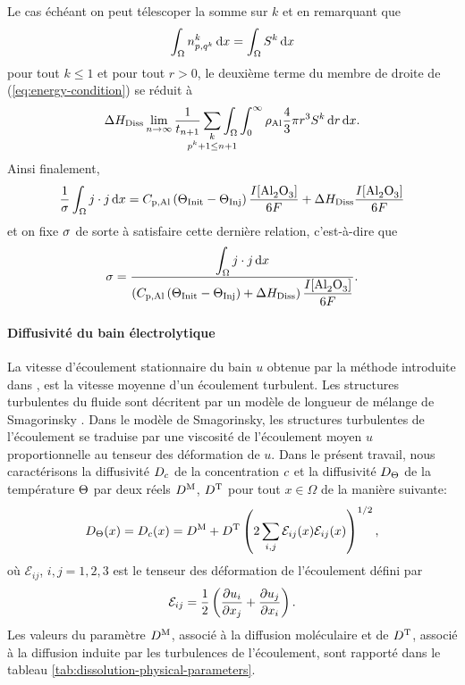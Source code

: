 Le cas échéant on peut télescoper la somme sur $k$ et en remarquant que
\begin{equation*}
  \int_\Omega n_{p,q^k}^k\,\mathrm dx = \int_\Omega S^k\,\mathrm dx
\end{equation*}
pour tout $k \leq 1$ et pour tout $r > 0$, le deuxième terme du
membre de droite de (\ref{eq:energy-condition}) se réduit à
\begin{equation*}
  {\aluminadissolutionenthalpy}\lim_{n\to\infty}\frac{1}{t_{n+1}}\sum_{\mathclap{\substack{k\\ p^k +
  1 \leq n + 1}}}\int_\Omega\int_0^\infty\aluminadensity
  \frac{4}{3}\pi r^3 S^k\intd{r}\intd{x}.
\end{equation*}
Ainsi finalement,
\begin{equation*}
  \frac{1}{\sigma}\int_\Omega j\cdot j\intd{x}
  =\aluminahc\parent{\tinit-\tinj}\frac{I[\cee{Al2O3}]}{6F} + {\aluminadissolutionenthalpy}\frac{I[\cee{Al2O3}]}{6F}
\end{equation*}
et on fixe $\sigma$ de sorte à satisfaire cette dernière
relation, c'est-à-dire que
\begin{equation}\label{eq:conductivity-condition}
  \conductivity = \frac{\displaystyle\int_\Omega j\cdot j\intd{x}}{\parent{\aluminahc\parent{\tinit-\tinj} + {\aluminadissolutionenthalpy} }
    \displaystyle\frac{I[\cee{Al2O3}]}{6F}}.
\end{equation}

\paragraph{Diffusivité du bain électrolytique} La vitesse d'écoulement
stationnaire du bain $u$ obtenue par la méthode introduite dans
\cite{Steiner2009}, \cite{Rochat2016} est la vitesse moyenne d'un
écoulement turbulent. Les structures turbulentes du fluide sont
décritent par un modèle de longueur de mélange de Smagorinsky
\cite{Rochat2016}. Dans le modèle de Smagorinsky, les structures
turbulentes de l'écoulement se traduise par une viscosité de
l'écoulement moyen $u$ proportionnelle au tenseur des déformation de
$u$. Dans le présent travail, nous caractérisons la diffusivité
$D_{c}$ de la concentration $c$ et la
diffusivité $D_\Theta$ de la température $\Theta$ par
deux réels $D^{\mathrm M}$, $D^{\mathrm T}$ pour tout
$x\in\Omega$ de la manière suivante:
\begin{align}
  D_\Theta(x) =  D_{c}(x) = D^{\mathrm M} +
  D^{\mathrm T}\left( 2\sum_{i,j}\mathcal E_{ij}(x)\mathcal E_{ij}(x) \right)^{1/2},
\end{align}
où $\mathcal E_{ij}$, $i, j = 1,2,3$ est le tenseur des déformation
de l'écoulement défini par
\begin{equation}
  \mathcal E_{ij} = \frac{1}{2}\left( \frac{\partial u_i}{\partial
      x_j} + \frac{\partial u_j}{\partial x_i} \right).
\end{equation}
Les valeurs du paramètre $D^{\mathrm M}$, associé à la diffusion
moléculaire et de $D^{\mathrm T}$, associé à la diffusion
induite par les turbulences de l'écoulement, sont rapporté dans le
tableau \ref{tab:dissolution-physical-parameters}.


